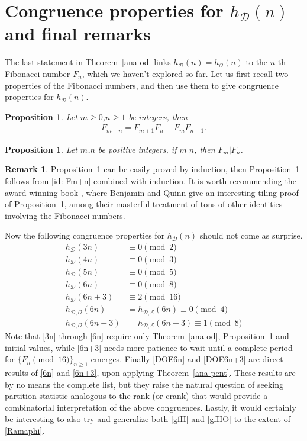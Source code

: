 \documentclass[12pt]{amsart}
\numberwithin{equation}{section}
\theoremstyle{plain}
\newtheorem{proposition}[theorem]{Proposition}
\theoremstyle{definition}
\newtheorem{remark}[theorem]{Remark}
\def\D{\mathcal{D}}
\def\O{\mathcal{O}}
\begin{document}
\section{Congruence properties for $h_{\D}(n)$ and final remarks}\label{sec:cong}
The last statement in Theorem~\ref{ana-od} links $h_{\D}(n)=h_{\O}(n)$ to the $n$-th Fibonacci number $F_n$, which we haven't explored so far. Let us first recall two properties of the Fibonacci numbers, and then use them to give congruence properties for $h_{\D}(n)$.
\begin{proposition}\label{Fm+n}
Let $m\geq 0$,$n\geq 1$ be integers, then
\begin{align}\label{id: Fm+n}
F_{m+n}=F_{m+1}F_{n}+F_{m}F_{n-1}.
\end{align}
\end{proposition}
\begin{proposition}\label{Fm|Fn}
Let $m$,$n$ be positive integers, if $m|n$, then $F_{m}|F_{n}$.
\end{proposition}
\begin{remark}
Proposition~\ref{Fm+n} can be easily proved by induction, then Proposition~\ref{Fm|Fn} follows from \eqref{id: Fm+n} combined with induction. It is worth recommending the award-winning book \cite{BQ}, where Benjamin and Quinn give an interesting tiling proof of Proposition~\ref{Fm+n}, among their masterful treatment of tons of other identities involving the Fibonacci numbers.
\end{remark}
Now the following congruence properties for $h_{\D}(n)$ should not come as surprise.
\begin{align}
h_{\mathcal{D}}(3n) &\equiv0\pmod{2}\label{3n}\\
h_{\mathcal{D}}(4n) &\equiv0\pmod{3}\\
h_{\mathcal{D}}(5n) &\equiv0\pmod{5}\\
h_{\mathcal{D}}(6n) &\equiv0 \pmod{8}\label{6n}\\
h_{\mathcal{D}}(6n+3) &\equiv2 \pmod{16}\label{6n+3}\\
h_{\mathcal{D, O}}(6n) &=h_{\mathcal{D, E}}(6n)\equiv0 \pmod{4}\label{DOE6n}\\
h_{\mathcal{D, O}}(6n+3) &=h_{\mathcal{D, E}}(6n+3)\equiv1 \pmod{8}\label{DOE6n+3}
\end{align}
Note that \eqref{3n} through \eqref{6n} require only Theorem~\ref{ana-od}, Proposition~\ref{Fm|Fn} and initial values, while \eqref{6n+3} needs more patience to wait until a complete period for $\{F_n \pmod{16}\}_{n\geq 1}$ emerges. Finally \eqref{DOE6n} and \eqref{DOE6n+3} are direct results of \eqref{6n} and \eqref{6n+3}, upon applying Theorem~\ref{ana-pent}. These results are by no means the complete list, but they raise the natural question of seeking partition statistic analogous to the rank (or crank) that would provide a combinatorial interpretation  of the above congruences. Lastly, it would certainly be interesting to also try and generalize both \eqref{gfH} and \eqref{gfHO} to the extent of \eqref{Ramaphi}.
\end{document}
